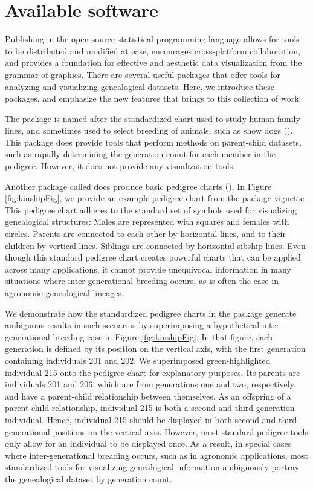 \documentclass[article,shortnames]{jss}
\begin{document}
\section{Available software}

Publishing in the open source  statistical programming language allows for tools to be distributed and modified at ease, encourages cross-platform collaboration, and provides a foundation for effective and aesthetic data visualization from the grammar of graphics. There are several useful  packages that offer tools for analyzing and visualizing genealogical datasets. Here, we introduce these packages, and emphasize the new features that  brings to this collection of work.

The  package  is named after the standardized chart used to study human family lines, and sometimes used to select breeding of animals, such as show dogs (\citealt{ped}). This package does provide tools that perform methods on parent-child datasets, such as rapidly determining the generation count for each member in the pedigree. However, it does not provide any visualization tools.

Another  package called  does produce basic pedigree charts (\citealt{kin}). In Figure \ref{fig:kinshipFig}, we provide an example pedigree chart from the  package vignette. This pedigree chart adheres to the standard set of symbols used for visualizing genealogical structures: Males are represented with squares and females with circles. Parents are connected to each other by horizontal lines, and to their children by vertical lines. Siblings are connected by horizontal sibship lines. Even though this standard pedigree chart creates powerful charts that can be applied across many applications, it cannot provide unequivocal information in many situations where inter-generational breeding occurs, as is often the case in agronomic genealogical lineages.

We demonstrate how the standardized pedigree charts in the  package generate ambiguous results in such scenarios by superimposing a hypothetical inter-generational breeding case in Figure \ref{fig:kinshipFig}. In that figure, each generation is defined by its position on the vertical axis, with the first generation containing individuals 201 and 202. We superimposed green-highlighted individual 215 onto the pedigree chart for explanatory purposes. Its parents are individuals 201 and 206, which are from generations one and two, respectively, and have a parent-child relationship between themselves. As an offspring of a parent-child relationship, individual 215 is both a second and third generation individual. Hence, individual 215 should be displayed in both second and third generational positions on the vertical axis. However, most standard pedigree tools only allow for an individual to be displayed once. As a result, in special cases where inter-generational breading occurs, such as in agronomic applications, most standardized tools for visualizing genealogical information ambiguously portray the genealogical dataset by generation count.
\end{document}
